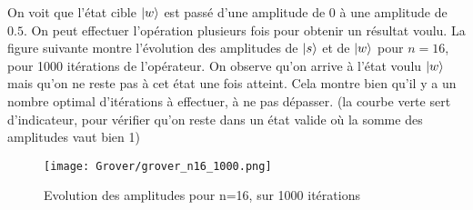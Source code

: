 On voit que l'état cible $\ket{w}$ est passé d'une amplitude de 0 à une amplitude de $0.5$. On peut effectuer l'opération plusieurs fois pour obtenir un résultat voulu. La figure suivante montre l'évolution des amplitudes de $\ket{s}$ et de $\ket{w}$ pour $n=16$, pour 1000 itérations de l'opérateur. On observe qu'on arrive à l'état voulu $\ket{w}$ mais qu'on ne reste pas à cet état une fois atteint. Cela montre bien qu'il y a un nombre optimal d'itérations à effectuer, à ne pas dépasser. (la courbe verte sert d'indicateur, pour vérifier qu'on reste dans un état valide où la somme des amplitudes vaut bien 1)

\begin{figure}[htbp]
  \centering
  \texttt{[image: Grover/grover\_n16\_1000.png]}
  \caption{Evolution des amplitudes pour n=16, sur 1000 itérations}
  \label{fig:univerise}
\end{figure}
